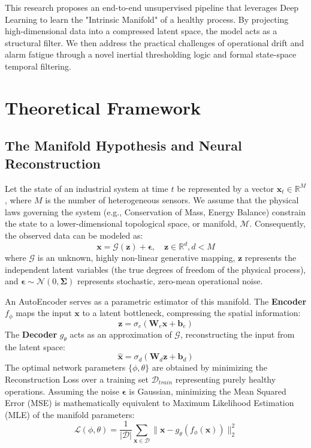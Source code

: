 \documentclass[journal]{IEEEtran}
\begin{document}
	This research proposes an end-to-end unsupervised pipeline that leverages Deep Learning to learn the "Intrinsic Manifold" of a healthy process. By projecting high-dimensional data into a compressed latent space, the model acts as a structural filter. We then address the practical challenges of operational drift and alarm fatigue through a novel inertial thresholding logic and formal state-space temporal filtering.
	
	\section{Theoretical Framework}
	
	\subsection{The Manifold Hypothesis and Neural Reconstruction}
	Let the state of an industrial system at time $t$ be represented by a vector $\mathbf{x}_t \in \mathbb{R}^M$, where $M$ is the number of heterogeneous sensors. We assume that the physical laws governing the system (e.g., Conservation of Mass, Energy Balance) constrain the state to a lower-dimensional topological space, or manifold, $\mathcal{M}$. Consequently, the observed data can be modeled as:
	\begin{equation}
		\mathbf{x} = \mathcal{G}(\mathbf{z}) + \bm{\epsilon}, \quad \mathbf{z} \in \mathbb{R}^d, d < M
	\end{equation}
	where $\mathcal{G}$ is an unknown, highly non-linear generative mapping, $\mathbf{z}$ represents the independent latent variables (the true degrees of freedom of the physical process), and $\bm{\epsilon} \sim \mathcal{N}(0, \mathbf{\Sigma})$ represents stochastic, zero-mean operational noise.
	
	An AutoEncoder serves as a parametric estimator of this manifold. The \textbf{Encoder} $f_{\phi}$ maps the input $\mathbf{x}$ to a latent bottleneck, compressing the spatial information:
	\begin{equation}
		\mathbf{z} = \sigma_e(\mathbf{W}_e \mathbf{x} + \mathbf{b}_e)
	\end{equation}
	The \textbf{Decoder} $g_{\theta}$ acts as an approximation of $\mathcal{G}$, reconstructing the input from the latent space:
	\begin{equation}
		\hat{\mathbf{x}} = \sigma_d(\mathbf{W}_d \mathbf{z} + \mathbf{b}_d)
	\end{equation}
	The optimal network parameters $\{\phi, \theta\}$ are obtained by minimizing the Reconstruction Loss over a training set $\mathcal{D}_{train}$ representing purely healthy operations. Assuming the noise $\bm{\epsilon}$ is Gaussian, minimizing the Mean Squared Error (MSE) is mathematically equivalent to Maximum Likelihood Estimation (MLE) of the manifold parameters:
	\begin{equation}
		\mathcal{L}(\phi, \theta) = \frac{1}{|\mathcal{D}|} \sum_{\mathbf{x} \in \mathcal{D}} \| \mathbf{x} - g_{\theta}(f_{\phi}(\mathbf{x})) \|^2_2
	\end{equation}
	
\end{document}
